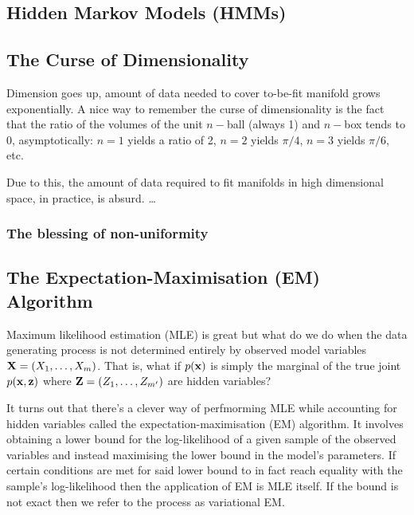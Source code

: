 \documentclass[11pt]{article}
\begin{document}
\begin{appendices}
\subsection{Hidden Markov Models (HMMs)}

\subsection{The Curse of Dimensionality}
Dimension goes up, amount of data needed to cover to-be-fit manifold grows exponentially. A nice way to remember the curse of dimensionality is the fact that the ratio of the volumes of the unit $n-$ball (always 1) and $n-$box tends to 0, asymptotically: $n=1$ yields a ratio of 2, $n=2$ yields $\pi/4$, $n=3$ yields $\pi/6$, etc.

Due to this, the amount of data required to fit manifolds in high dimensional space, in practice, is absurd. \dots

\subsubsection{The blessing of non-uniformity}

\subsection{The Expectation-Maximisation (EM) Algorithm}
Maximum likelihood estimation (MLE) is great but what do we do when the data generating process is not determined entirely by observed model variables $\mathbf{X}=(X_1,\dots,X_m)$. That is, what if $p(\mathbf{x})$ is simply the marginal of the true joint $p(\mathbf{x},\mathbf{z})$ where $\mathbf{Z}=(Z_1,\dots,Z_{m'})$ are hidden variables?

It turns out that there's a clever way of perfmorming MLE while accounting for hidden variables called the expectation-maximisation (EM) algorithm. It involves obtaining a lower bound for the log-likelihood of a given sample of the observed variables and instead maximising the lower bound in the model's parameters. If certain conditions are met for said lower bound to in fact reach equality with the sample's log-likelihood then the application of EM is MLE itself. If the bound is not exact then we refer to the process as variational EM.


\end{appendices}
\end{document}
